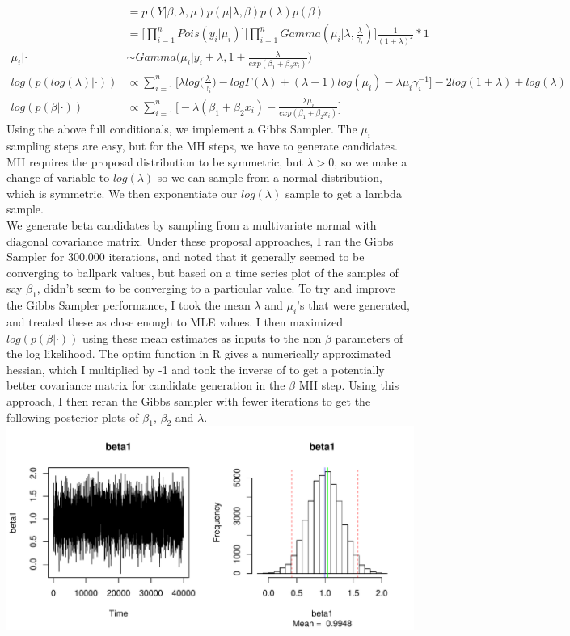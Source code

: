 \documentclass[12pt]{article}
\begin{document}
\begin{enumerate}[(a)]
\begin{enumerate}[(i)]
\begin{align*}
	&= p(Y|\beta, \lambda, \mu)p(\mu|\lambda, \beta) p(\lambda)p(\beta) \\
	&= \bigg[\prod_{i=1}^{n}Pois(y_i|\mu_i)\bigg]\bigg[\prod_{i=1}^{n}Gamma(\mu_i|\lambda, \frac{\lambda}{\gamma_i})\bigg] \frac{1}{(1+\lambda)^2} *1 \\
	\mu_i|\cdot &\sim Gamma\bigg(\mu_i|y_i + \lambda, 1 + \frac{\lambda}{exp(\beta_1 + \beta_2 x_i)}\bigg)\\
	log(p(log(\lambda)|\cdot)) &\propto \sum_{i=1}^{n} \bigg[\lambda log\bigg(\frac{\lambda}{\gamma_i}\bigg) - log\Gamma(\lambda) +(\lambda - 1) log(\mu_i)- \lambda \mu_i \gamma_i^{-1}\bigg] - 2log(1 + \lambda)  + log(\lambda)\\
	log(p(\beta|\cdot)) &\propto \sum_{i=1}^{n} \bigg[-\lambda(\beta_1 + \beta_2 x_i) - \frac{\lambda \mu_i}{exp(\beta_1 + \beta_2 x_i)}\bigg]
	\end{align*}
	Using the above full conditionals, we implement a Gibbs Sampler. The $\mu_i$ sampling steps are easy, but for the MH steps, we have to generate candidates. MH requires the proposal distribution to be symmetric, but $\lambda >0$, so we make a change of variable to $log(\lambda)$ so we can sample from a normal distribution, which is symmetric. We then exponentiate our $log(\lambda)$ sample to get a lambda sample.   \\
	We generate beta candidates by sampling from a multivariate normal with diagonal covariance matrix. Under these proposal approaches, I ran the Gibbs Sampler for 300,000 iterations, and noted that it generally seemed to be converging to  ballpark values, but based on a time series plot of the samples of say $\beta_1$, didn't seem to be converging to a particular value. To try and improve the Gibbs Sampler performance, I took the mean $\lambda$ and $\mu_i$'s that were generated, and treated these as close enough to MLE values. I then maximized $log(p(\beta|\cdot))$ using these mean estimates as inputs to the non $\beta$ parameters of the log likelihood. The optim function in R gives a numerically approximated hessian, which I multiplied by -1 and took the inverse of to get a potentially better covariance matrix for candidate generation in the $\beta$ MH step.  Using this approach, I then reran the Gibbs sampler with fewer iterations to get the following posterior plots of $\beta_1$, $\beta_2$ and $\lambda$. \\
	\newline
	\includegraphics[scale = .7]{plot7.pdf} \\

\end{enumerate}
\end{enumerate}
\end{document}
